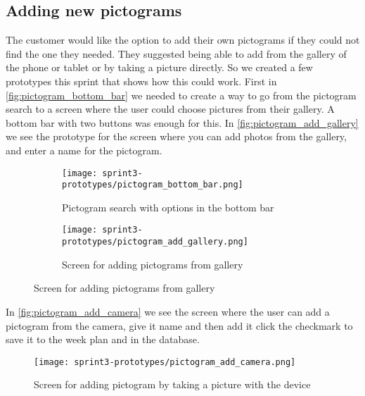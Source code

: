 \subsection{Adding new pictograms}
The customer would like the option to add their own pictograms if they could not find the one they needed. They suggested being able to add from the gallery of the phone or tablet or by taking a picture directly. So we created a few prototypes this sprint that shows how this could work. First in \autoref{fig:pictogram_bottom_bar} we needed to create a way to go from the pictogram search to a screen where the user could choose pictures from their gallery.
A bottom bar with two buttons was enough for this. In \autoref{fig:pictogram_add_gallery} we see the prototype for the screen where you can add photos from the gallery, and enter a name for the pictogram.
\begin{figure}[H]
    \begin{subfigure}{0.5\textwidth}
    \texttt{[image: sprint3-prototypes/pictogram\_bottom\_bar.png]} 
    \caption{Pictogram search with options in the bottom bar}
    \label{fig:pictogram_bottom_bar}
    \end{subfigure}
    \begin{subfigure}{0.5\textwidth}
        \texttt{[image: sprint3-prototypes/pictogram\_add\_gallery.png]}
    \caption{Screen for adding pictograms from gallery}
    \label{fig:pictogram_add_gallery}
    \end{subfigure} 
\end{figure}
In \autoref{fig:pictogram_add_camera} we see the screen where the user can add a pictogram from the camera, give it name and then add it click the checkmark to save it to the week plan and in the database.

\begin{figure}
    \centering
    \texttt{[image: sprint3-prototypes/pictogram\_add\_camera.png]}
    \caption{Screen for adding pictogram by taking a picture with the device}
    \label{fig:pictogram_add_camera}
\end{figure}
